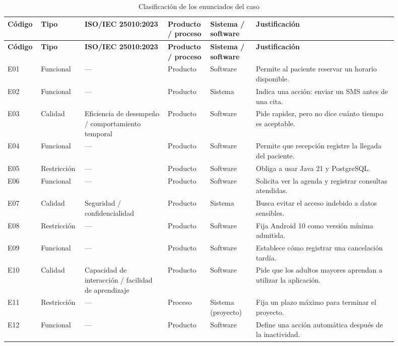 \documentclass[conference,onecolumn]{IEEEtran}
\begin{document}
\begingroup
\footnotesize
\renewcommand{\arraystretch}{1.18}
\setlength{\tabcolsep}{2pt}
\begin{longtable}{@{}p{0.055\linewidth}p{0.09\linewidth}p{0.205\linewidth}p{0.09\linewidth}p{0.115\linewidth}p{0.34\linewidth}@{}}
\caption{Clasificación de los enunciados del caso}\label{tab:clasificacion}\\
\toprule
\textbf{Código} & \textbf{Tipo} & \textbf{ISO/IEC 25010:2023} & \textbf{Producto / proceso} & \textbf{Sistema / software} & \textbf{Justificación} \\
\midrule
\endfirsthead
\toprule
\textbf{Código} & \textbf{Tipo} & \textbf{ISO/IEC 25010:2023} & \textbf{Producto / proceso} & \textbf{Sistema / software} & \textbf{Justificación} \\
\midrule
\endhead
\bottomrule
\endfoot
E01 & Funcional & --- & Producto & Software & Permite al paciente reservar un horario disponible. \\
E02 & Funcional & --- & Producto & Sistema & Indica una acción: enviar un SMS antes de una cita. \\
E03 & Calidad & Eficiencia de desempeño / comportamiento temporal & Producto & Software & Pide rapidez, pero no dice cuánto tiempo es aceptable. \\
E04 & Funcional & --- & Producto & Software & Permite que recepción registre la llegada del paciente. \\
E05 & Restricción & --- & Producto & Software & Obliga a usar Java 21 y PostgreSQL. \\
E06 & Funcional & --- & Producto & Software & Solicita ver la agenda y registrar consultas atendidas. \\
E07 & Calidad & Seguridad / confidencialidad & Producto & Sistema & Busca evitar el acceso indebido a datos sensibles. \\
E08 & Restricción & --- & Producto & Software & Fija Android 10 como versión mínima admitida. \\
E09 & Funcional & --- & Producto & Software & Establece cómo registrar una cancelación tardía. \\
E10 & Calidad & Capacidad de interacción / facilidad de aprendizaje & Producto & Software & Pide que los adultos mayores aprendan a utilizar la aplicación. \\
E11 & Restricción & --- & Proceso & Sistema (proyecto) & Fija un plazo máximo para terminar el proyecto. \\
E12 & Funcional & --- & Producto & Software & Define una acción automática después de la inactividad. \\

\end{longtable}
\end{document}
